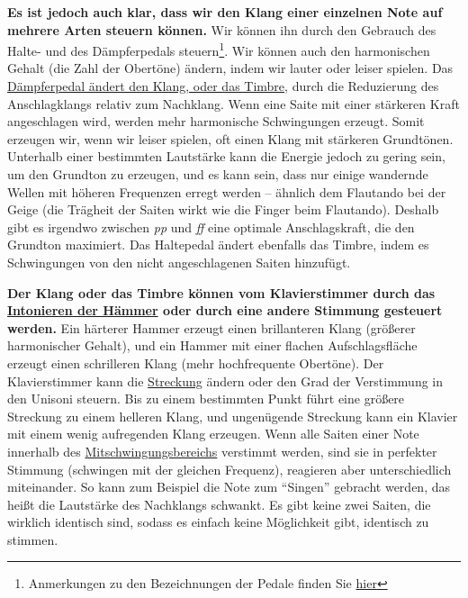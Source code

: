 \textbf{Es ist jedoch auch klar, dass wir den Klang einer einzelnen Note auf mehrere Arten steuern können.}
Wir können ihn durch den Gebrauch des Halte- und des Dämpferpedals steuern\footnote{Anmerkungen zu den Bezeichnungen der Pedale finden Sie \hyperref[Pedale]{hier}}.
Wir können auch den harmonischen Gehalt (die Zahl der Obertöne) ändern, indem wir lauter oder leiser spielen.
Das \hyperref[c1ii24]{Dämpferpedal ändert den Klang, oder das Timbre}, durch die Reduzierung des Anschlagklangs relativ zum Nachklang.
Wenn eine Saite mit einer stärkeren Kraft angeschlagen wird, werden mehr harmonische Schwingungen erzeugt.
Somit erzeugen wir, wenn wir leiser spielen, oft einen Klang mit stärkeren Grundtönen.
Unterhalb einer bestimmten Lautstärke kann die Energie jedoch zu gering sein, um den Grundton zu erzeugen, und es kann sein, dass nur einige wandernde Wellen mit höheren Frequenzen erregt werden -- ähnlich dem Flautando bei der Geige (die Trägheit der Saiten wirkt wie die Finger beim Flautando).
Deshalb gibt es irgendwo zwischen \textit{pp} und \textit{ff} eine optimale Anschlagskraft, die den Grundton maximiert.
Das Haltepedal ändert ebenfalls das Timbre, indem es Schwingungen von den nicht angeschlagenen Saiten hinzufügt.

\textbf{Der Klang oder das Timbre können vom Klavierstimmer durch das \hyperref[c2_7_hamm]{Intonieren der Hämmer} oder durch eine andere Stimmung gesteuert werden.}
Ein härterer Hammer erzeugt einen brillanteren Klang (größerer harmonischer Gehalt), und ein Hammer mit einer flachen  Aufschlagsfläche erzeugt einen schrilleren Klang (mehr hochfrequente Obertöne).
Der Klavierstimmer kann die \hyperref[c2_5_stre]{Streckung} ändern oder den Grad der Verstimmung in den Unisoni steuern.
Bis zu einem bestimmten Punkt führt eine größere Streckung zu einem helleren Klang, und ungenügende Streckung kann ein Klavier mit einem wenig aufregenden Klang erzeugen.
Wenn alle Saiten einer Note innerhalb des \hyperref[c2_5_mits]{Mitschwingungsbereichs} verstimmt werden, sind sie in perfekter Stimmung (schwingen mit der gleichen Frequenz), reagieren aber unterschiedlich miteinander.
So kann zum Beispiel die Note zum \enquote{Singen} gebracht werden, das heißt die Lautstärke des Nachklangs schwankt.
Es gibt keine zwei Saiten, die wirklich identisch sind, sodass es einfach keine Möglichkeit gibt, identisch zu stimmen.

